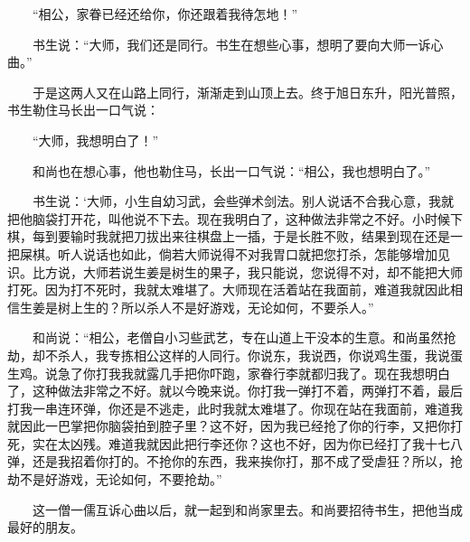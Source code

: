 　　“相公，家眷已经还给你，你还跟着我待怎地！” 

　　书生说：“大师，我们还是同行。书生在想些心事，想明了要向大师一诉心曲。” 

　　于是这两人又在山路上同行，渐渐走到山顶上去。终于旭日东升，阳光普照，书生勒住马长出一口气说： 

　　“大师，我想明白了！” 

　　和尚也在想心事，他也勒住马，长出一口气说：“相公，我也想明白了。” 

　　书生说：‘大师，小生自幼习武，会些弹术剑法。别人说话不合我心意，我就把他脑袋打开花，叫他说不下去。现在我明白了，这种做法非常之不好。小时候下棋，每到要输时我就把刀拔出来往棋盘上一插，于是长胜不败，结果到现在还是一把屎棋。听人说话也如此，倘若大师说得不对我胃口就把您打杀，怎能够增加见识。比方说，大师若说生姜是树生的果子，我只能说，您说得不对，却不能把大师打死。因为打不死时，我就太难堪了。大师现在活着站在我面前，难道我就因此相信生姜是树上生的？所以杀人不是好游戏，无论如何，不要杀人。” 

　　和尚说：“相公，老僧自小习些武艺，专在山道上干没本的生意。和尚虽然抢劫，却不杀人，我专拣相公这样的人同行。你说东，我说西，你说鸡生蛋，我说蛋生鸡。说急了你打我我就露几手把你吓跑，家眷行李就都归我了。现在我想明白了，这种做法非常之不好。就以今晚来说。你打我一弹打不着，两弹打不着，最后打我一串连环弹，你还是不逃走，此时我就太难堪了。你现在站在我面前，难道我就因此一巴掌把你脑袋拍到腔子里？这不好，因为我已经抢了你的行李，又把你打死，实在太凶残。难道我就因此把行李还你？这也不好，因为你已经打了我十七八弹，还是我招着你打的。不抢你的东西，我来挨你打，那不成了受虐狂？所以，抢劫不是好游戏，无论如何，不要抢劫。” 

　　这一僧一儒互诉心曲以后，就一起到和尚家里去。和尚要招待书生，把他当成最好的朋友。 
